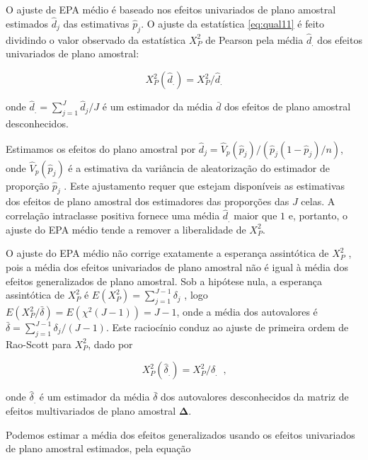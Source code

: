 \documentclass[]{book}
\theoremstyle{definition}
\theoremstyle{definition}
\theoremstyle{definition}
\theoremstyle{remark}
\begin{document}
O ajuste de EPA médio é baseado nos efeitos univariados de plano
amostral estimados \(\hat{d}_{j}\) das estimativas \(\hat{p}_{j}\). O
ajuste da estatística \eqref{eq:qual11} é feito dividindo o valor
observado da estatística \(X_{P}^{2}\) de Pearson pela média
\(\hat{d}_{.}\) dos efeitos univariados de plano amostral:

\begin{equation}
X_{P}^{2}\left( \hat{d}_{.}\right) =X_{P}^{2}/\hat{d}_{.}  
\label{eq:qual12}
\end{equation}

onde \(\hat{d}_{.}=\sum_{j=1}^{J}\hat{d}_{j}/J\) é um estimador da média
\(\bar{d}\) dos efeitos de plano amostral desconhecidos.

Estimamos os efeitos do plano amostral por
\(\hat{d}_{j}=\hat{V}_{p}\left(\hat{p}_{j}\right) /\left( \hat{p}_{j}\left( 1-\hat{p}_{j}\right) /n\right)\),
onde \(\hat{V}_{p}\left( \hat{p}_{j}\right)\) é a estimativa da
variância de aleatorização do estimador de proporção \(\hat{p}_{j}\) .
Este ajustamento requer que estejam disponíveis as estimativas dos
efeitos de plano amostral dos estimadores das proporções das \(J\)
celas. A correlação intraclasse positiva fornece uma média
\(\hat{d}_{.}\) maior que \(1\) e, portanto, o ajuste do EPA médio tende
a remover a liberalidade de \(X_{P}^{2}\).

O ajuste do EPA médio não corrige exatamente a esperança assintótica de
\(X_{P}^{2}\) , pois a média dos efeitos univariados de plano amostral
não é igual à média dos efeitos generalizados de plano amostral. Sob a
hipótese nula, a esperança assintótica de \(X_{P}^{2}\) é
\(E\left( X_{P}^{2}\right) =\sum_{j=1}^{J-1}\delta _{j}\) , logo
\(E\left( X_{P}^{2}/\bar{\delta}\right) =E\left( \chi ^{2}\left(J-1\right) \right) =J-1\),
onde a média dos autovalores é
\(\bar{\delta}=\sum_{j=1}^{J-1}\delta _{j}/\left( J-1\right)\). Este
raciocínio conduz ao ajuste de primeira ordem de Rao-Scott para
\(X_{P}^{2}\), dado por

\begin{equation}
X_{P}^{2}\left( \hat{\delta}_{.}\right) =X_{P}^{2}/\hat{\delta}_{.}\;\;\mbox{,}
\label{eq:qual13}
\end{equation}

onde \(\hat{\delta}_{.}\) é um estimador da média \(\bar{\delta}\) dos
autovalores desconhecidos da matriz de efeitos multivariados de plano
amostral \(\mathbf{\Delta }\).

Podemos estimar a média dos efeitos generalizados usando os efeitos
univariados de plano amostral estimados, pela equação
\end{document}
